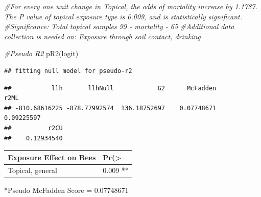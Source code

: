 \documentclass[
  12pt,
]{article}
\newenvironment{Shaded}{\begin{snugshade}}{\end{snugshade}}
\newcommand{\AttributeTok}[1]{\textcolor[rgb]{0.77,0.63,0.00}{#1}}
\newcommand{\CommentTok}[1]{\textcolor[rgb]{0.56,0.35,0.01}{\textit{#1}}}
\newcommand{\DecValTok}[1]{\textcolor[rgb]{0.00,0.00,0.81}{#1}}
\newcommand{\FunctionTok}[1]{\textcolor[rgb]{0.00,0.00,0.00}{#1}}
\newcommand{\NormalTok}[1]{#1}
\newcommand{\OtherTok}[1]{\textcolor[rgb]{0.56,0.35,0.01}{#1}}
\newcommand{\SpecialCharTok}[1]{\textcolor[rgb]{0.00,0.00,0.00}{#1}}
\newcommand{\StringTok}[1]{\textcolor[rgb]{0.31,0.60,0.02}{#1}}
\begin{document}
\begin{Shaded}
\begin{Highlighting}[]
\CommentTok{\#For every one unit change in Topical, the odds of mortality increase by 1.1787. The P value of topical exposure type is 0.009, and is statistically significant.}
\CommentTok{\#Significance: Total topical samples 99 {-} mortality {-} 65}
\CommentTok{\#Additional data collection is needed on: Exposure through soil contact, drinking}

\CommentTok{\#Pseudo R2}
 \FunctionTok{pR2}\NormalTok{(logit)}
\end{Highlighting}
\end{Shaded}

\begin{verbatim}
## fitting null model for pseudo-r2
\end{verbatim}

\begin{verbatim}
##           llh       llhNull            G2      McFadden          r2ML 
## -810.68616225 -878.77992574  136.18752697    0.07748671    0.09225597 
##          r2CU 
##    0.12934540
\end{verbatim}

\begin{longtable}[]{@{}ll@{}}
\toprule
Exposure Effect on Bees & Pr(\textgreater{} \\
\midrule
\endhead
Topical, general & 0.009 ** \\
\bottomrule
\end{longtable}

*Pseudo McFadden Score = 0.07748671

\begin{Shaded}
\end{Shaded}
\end{document}
